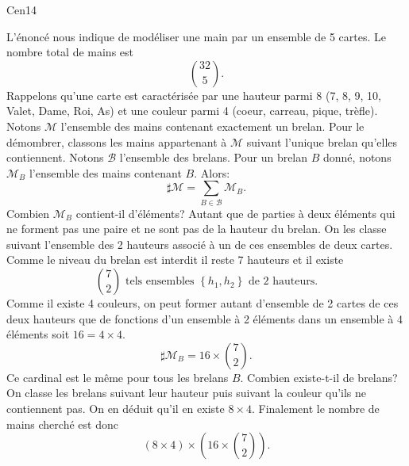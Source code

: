 \begin{tiny}Cen14\end{tiny} L'énoncé nous indique de modéliser une main par un ensemble de 5 cartes. Le nombre total de mains est 
\[
 \binom{32}{5}.
\]
Rappelons qu'une carte est caractérisée par une hauteur parmi 8 (7, 8, 9, 10, Valet, Dame, Roi, As) et une couleur parmi 4 (coeur, carreau, pique, trèfle).\newline
Notons $\mathcal{M}$ l'ensemble des mains contenant exactement un brelan. Pour le démombrer, classons les mains appartenant à $\mathcal{M}$ suivant l'unique brelan qu'elles contiennent. Notons $\mathcal{B}$ l'ensemble des brelans. Pour un brelan $B$ donné, notons $\mathcal{M}_B$ l'ensemble des mains contenant $B$. Alors:
\[
 \sharp \mathcal{M} = \sum_{B \in \mathcal{B}} \mathcal{M}_B.
\]
Combien $\mathcal{M}_B$ contient-il d'éléments? Autant que de parties à deux éléments qui ne forment pas une paire et ne sont pas de la hauteur du brelan. On les classe suivant l'ensemble des 2 hauteurs associé à un de ces ensembles de deux cartes. Comme le niveau du brelan est interdit il reste 7 hauteurs et il existe 
\[
 \binom{7}{2} \text{ tels ensembles } \left\lbrace h_1, h_2 \right\rbrace \text{ de 2 hauteurs}.
\]
Comme il existe 4 couleurs, on peut former autant d'ensemble de 2 cartes de ces deux hauteurs que de fonctions d'un ensemble à 2 éléments dans un ensemble à 4 éléments soit $16 = 4 \times 4$.
\[
 \sharp \mathcal{M}_B = 16 \times \binom{7}{2}.
\]
Ce cardinal est le même pour tous les brelans $B$. Combien existe-t-il de brelans?\newline
On classe les brelans suivant leur hauteur puis suivant la couleur qu'ils ne contiennent pas. On en déduit qu'il en existe $8 \times 4$.
Finalement le nombre de mains cherché est donc
\[
 (8 \times 4) \times (16 \times \binom{7}{2}).
\]
